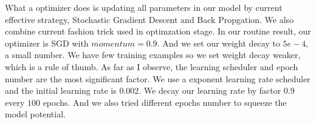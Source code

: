 \documentclass[12pt]{article}
\begin{document}
What a optimizer does is updating all parameters in our model by current effective strategy, Stochastic Gradient Descent and Back Propgation. We also combine current fashion trick used in optimzation stage. In our routine result, our optimizer is SGD with $momentum = 0.9$. And we set our weight decay to $5e-4$, a small number. We have few training examples so we set weight decay weaker, which is a rule of thumb. As far as I observe, the learning scheduler and epoch number are the most significant factor. We use a exponent learning rate scheduler and the initial learning rate is 0.002. We decay our learning rate by factor $0.9$ every $100$ epochs. And we also tried different epochs number to squeeze the model potential.\\
\end{document}
